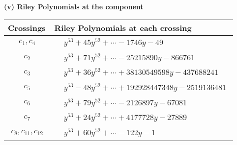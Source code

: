 \documentclass[1p]{elsarticle_modified}
\theoremstyle{definition}
\begin{document}
\newpage\renewcommand{\arraystretch}{1}
\flushleft \textbf{(v) Riley Polynomials at the component}\newline \\
\begin{tabular}{m{50pt}|m{274pt}}
Crossings & \hspace{64pt}Riley Polynomials at each crossing \\
\hline $$\begin{aligned}c_{1},c_{4}\end{aligned}$$&$\begin{aligned}
&y^{53}+45 y^{52}+\cdots-1746 y-49
\end{aligned}$\\
\hline $$\begin{aligned}c_{2}\end{aligned}$$&$\begin{aligned}
&y^{53}+71 y^{52}+\cdots-25215890 y-866761
\end{aligned}$\\
\hline $$\begin{aligned}c_{3}\end{aligned}$$&$\begin{aligned}
&y^{53}+36 y^{52}+\cdots+38130549598 y-437688241
\end{aligned}$\\
\hline $$\begin{aligned}c_{5}\end{aligned}$$&$\begin{aligned}
&y^{53}-48 y^{52}+\cdots+192928447348 y-2519136481
\end{aligned}$\\
\hline $$\begin{aligned}c_{6}\end{aligned}$$&$\begin{aligned}
&y^{53}+79 y^{52}+\cdots-2126897 y-67081
\end{aligned}$\\
\hline $$\begin{aligned}c_{7}\end{aligned}$$&$\begin{aligned}
&y^{53}+24 y^{52}+\cdots+4177728 y-27889
\end{aligned}$\\
\hline $$\begin{aligned}c_{8},c_{11},c_{12}\end{aligned}$$&$\begin{aligned}
&y^{53}+60 y^{52}+\cdots-122 y-1
\end{aligned}$\\

\end{tabular}
\end{document}
